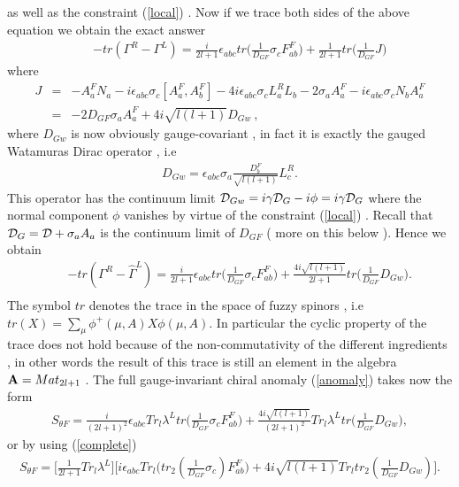 \documentclass[a4paper,10pt]{article}
\begin{document}
as well as the constraint (\ref{local}) . Now if we trace both
sides of the above equation we obtain the exact answer
\begin{eqnarray}
&&-tr({\Gamma}^R-{\Gamma}^L)=
\frac{i}{2l+1}{\epsilon}_{abc}tr\big(\frac{1}{D_{GF}}{\sigma}_cF_{ab}^F\big)+\frac{1}{2l+1}tr\big(\frac{1}{D_{GF}}J\big)\nonumber
\end{eqnarray}
where
\begin{eqnarray}
J&=&-A_a^FN_a-i{\epsilon}_{abc}{\sigma}_c[A_a^F,A_b^F]-4i{\epsilon}_{abc}{\sigma}_cL_a^RL_b-2{\sigma}_aA_a^F-i{\epsilon}_{abc}{\sigma}_cN_bA_a^F\nonumber\\
&=&-2D_{GF}{\sigma}_a{A}_a^F+4i\sqrt{l(l+1)}D_{Gw}~,
\end{eqnarray}
where $D_{Gw}$ is now obviously gauge-covariant , in fact it is exactly the gauged Watamuras Dirac operator \cite{watamuras} , i.e
\begin{eqnarray}
D_{Gw}={\epsilon}_{abc}{\sigma}_a\frac{D_b^F}{\sqrt{l(l+1)}}L_c^R.
\end{eqnarray}
This operator has the continuum limit ${\cal D}_{Gw}=i{\gamma}{\cal D}_G-i{\phi}=i{\gamma}{\cal D}_G$ where the normal component $\phi$ vanishes by virtue of the constraint (\ref{local}) . Recall that ${\cal D}_G={\cal D}+{\sigma}_aA_a$ is the continuum limit of $D_{GF}$ ( more on this below ). Hence we obtain
\begin{eqnarray}
&&-tr({\Gamma}^R-\hat{\Gamma}^L)=
\frac{i}{2l+1}{\epsilon}_{abc}tr\big(\frac{1}{D_{GF}}{\sigma}_cF_{ab}^F\big)+\frac{4i\sqrt{l(l+1)}}{2l+1}tr\big(\frac{1}{D_{GF}}D_{Gw}\big).\nonumber\\
\end{eqnarray}
The symbol $tr$ denotes the trace in the space of fuzzy spinors ,
i.e $ tr(X)=\sum_{\mu}{\phi}^{+}(\mu,A)X{\phi}(\mu,A)$. In
particular the cyclic property of the trace does not hold because
of the non-commutativity of the different ingredients , in other
words the result of this trace is still an element in the algebra
${\bf A}=Mat_{2l+1}$ . The full gauge-invariant chiral anomaly (\ref{anomaly})
takes now the form
\begin{eqnarray}
S_{\theta F}
=\frac{i}{(2l+1)^2}{\epsilon}_{abc}Tr_{l}{\lambda}^Ltr\big(\frac{1}{D_{GF}}{\sigma}_cF_{ab}^F\big)+\frac{4i\sqrt{l(l+1)}}{(2l+1)^2}Tr_l{\lambda}^Ltr\big(\frac{1}{D_{GF}}D_{Gw}\big),\nonumber
\end{eqnarray}
or by using (\ref{complete})
\begin{eqnarray}
S_{\theta
F}=\bigg[\frac{1}{2l+1}Tr_l{\lambda}^L\bigg]\bigg[i{\epsilon}_{abc}Tr_l\bigg(tr_2(\frac{1}{D_{GF}}{\sigma}_c)F_{ab}^F\bigg)+4i\sqrt{l(l+1)}Tr_ltr_2(\frac{1}{D_{GF}}D_{Gw})\bigg].
\end{eqnarray}
\end{document}
